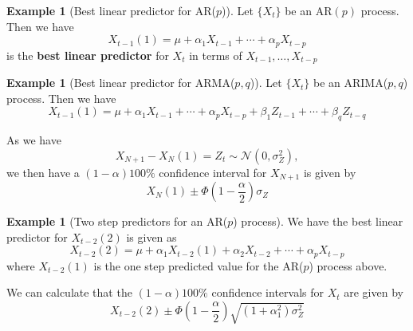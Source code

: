 \documentclass[10pt, oneside, reqno]{amsart}
\theoremstyle{plain}%
\theoremstyle{definition}
\newtheorem{exmp}[thm]{Example}
\theoremstyle{remark}
\newcommand{\ts}[1]{\{ #1 \}}
\begin{document}
	
\begin{exmp}[Best linear predictor for AR($p$)]
	Let $\ts{X_t}$ be an AR$(p)$ process.  Then we have \[
	 X_{t-1}(1) = \mu +	\alpha_1 X_{t-1} + \cdots + \alpha_p X_{t-p}
	\]
	is the \textbf{best linear predictor} for $X_t$ in terms of $X_{t-1}, \dots, X_{t-p}$
\end{exmp}	

\begin{exmp}[Best linear predictor for ARMA($p,q$)]
	Let $\ts{X_t}$ be an ARIMA($p,q$) process.  Then we have \[
		X_{t-1}(1) = \mu + \alpha_1 X_{t-1} + \cdots + \alpha_p X_{t-p} + \beta_1 Z_{t-1} + \cdots + \beta_q Z_{t-q}
	\]
	
	As we have \[
		X_{N+1} - X_N(1) = Z_t \sim \mathcal{N}(0,\sigma_Z^2),
	\]
	we then have a $(1- \alpha)100 \%$ confidence interval for $X_{N+1}$ is given by \[
		X_N(1) \pm \Phi\left(1 - \frac{\alpha}{2}\right) \sigma_Z
	\]
\end{exmp}

\begin{exmp}[Two step predictors for an AR($p$) process]
	We have the best linear predictor for $X_{t-2}(2)$ is given as \[
		X_{t-2}(2) = \mu +  \alpha_1 X_{t-2}(1) + \alpha_2 X_{t-2} + \cdots + \alpha_p X_{t-p}
	\]
	where $X_{t-2}(1)$ is the one step predicted value for the AR($p$) process above.
	
We can calculate that the $(1- \alpha)100\%$ confidence intervals for $X_{t}$ are given by \[
	X_{t-2}(2) \pm \Phi\left(1 - \frac{\alpha}{2}\right) \sqrt{(1 + \alpha_1^2) \sigma_Z^2}
\]
\end{exmp}
\end{document}

